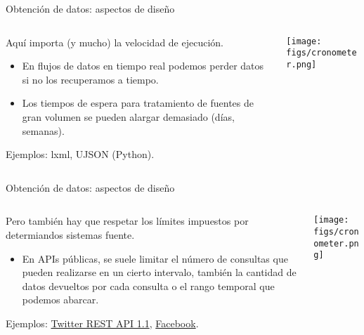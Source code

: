 
\begin{frame}{Obtención de datos: aspectos de diseño}
 \begin{columns}[T]
    \begin{column}{.8\textwidth}
  \begin{wideitemize}
  \item Aquí importa (y mucho) la velocidad de ejecución.
  \begin{itemize}
   \item En flujos de datos en tiempo real podemos perder datos si no los recuperamos
   a tiempo.
   \item Los tiempos de espera para tratamiento de fuentes de gran volumen se pueden 
   alargar demasiado (días, semanas).
  \end{itemize}

  \item Ejemplos: lxml, UJSON (Python).
  
 \end{wideitemize}
    \end{column}
    \begin{column}{.2\textwidth}
    \vspace*{0.8cm}
    \texttt{[image: figs/cronometer.png]}
    \end{column}
  \end{columns}

\end{frame}


\begin{frame}{Obtención de datos: aspectos de diseño}
 \begin{columns}[T]
    \begin{column}{.8\textwidth}
  \begin{wideitemize}
  \item Pero también hay que respetar los límites impuestos por determiandos sistemas
  fuente.
  \begin{itemize}
   \item En APIs públicas, se suele limitar el número de consultas que pueden realizarse
   en un cierto intervalo, también la cantidad de datos devueltos por cada consulta o
   el rango temporal que podemos abarcar.
  \end{itemize}

  \item Ejemplos: \href{https://dev.twitter.com/docs/rate-limiting/1.1}{Twitter REST API 1.1}, 
  \href{https://developers.facebook.com/docs/reference/ads-api/api-rate-limiting/}{Facebook}.
  
 \end{wideitemize}
    \end{column}
    \begin{column}{.2\textwidth}
    \vspace*{0.8cm}
    \texttt{[image: figs/cronometer.png]}
    \end{column}
  \end{columns}

\end{frame}

